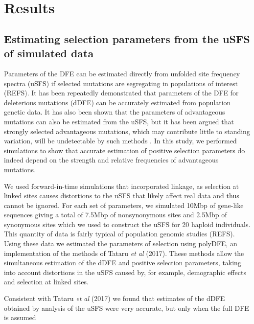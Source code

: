 \documentclass[11pt]{article}
\begin{document}
\section*{Results}

\subsection*{Estimating selection parameters from the uSFS of simulated data}

	Parameters of the DFE can be estimated directly from unfolded site frequency spectra (uSFS) if selected mutations are segregating in populations of interest (REFS). It has been repeatedly demonstrated that parameters of the DFE for deleterious mutations (dDFE) can be accurately estimated from population genetic data. It has also been shown that the parameters of advantageous mutations can also be estimated from the uSFS, but it has been argued that strongly selected advantageous mutations, which may contribute little to standing variation, will be undetectable by such methods \citep{RN323}. In this study, we performed simulations to show that accurate estimation of positive selection parameters do indeed depend on the strength and relative frequencies of advantageous mutations.
	
	We used forward-in-time simulations that incorporated linkage, as selection at linked sites causes distortions to the uSFS that likely affect real data and thus cannot be ignored. For each set of parameters, we simulated 10Mbp of gene-like sequences giving a total of 7.5Mbp of nonsynonymous sites and 2.5Mbp of synonymous sites which we used to construct the uSFS for 20 haploid individuals. This quantity of data is fairly typical of population genomic studies (REFS). Using these data we estimated the parameters of selection using polyDFE, an implementation of the methods of Tataru \textit{et al} (2017). These methods allow the simultaneous estimation of the dDFE and positive selection parameters, taking into account distortions in the uSFS caused by, for example, demographic effects and selection at linked sites. 

Consistent with Tataru \textit{et al} (2017) we found that estimates of the dDFE obtained by analysis of the uSFS were very accurate, but only when the full DFE is assumed 
\end{document}
